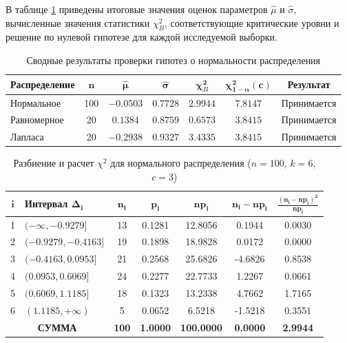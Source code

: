 \documentclass[a4paper, 14pt]{extarticle}
\begin{document}
В таблице \ref{tab:chi2_summary} приведены итоговые значения оценок параметров $\hat{\mu}$ и $\hat{\sigma}$, вычисленные значения статистики $\chi^2_{\textit{B}}$, соответствующие критические уровни и решение по нулевой гипотезе для каждой исследуемой выборки.

\begin{table}[H]
    \centering
    \caption{Сводные результаты проверки гипотез о нормальности распределения}
    \label{tab:chi2_summary}
    \begin{tabular}{|l|c|c|c|c|c|c|}
        \hline
        \textbf{Распределение} & $\mathbf{n}$ & $\mathbf{\hat{\mu}}$ & $\mathbf{\hat{\sigma}}$ & $\mathbf{\chi^2_{\textit{B}}}$ & $\mathbf{\chi^2_{1-\alpha}(c)}$ & \textbf{Результат} \\ \hline
        Нормальное & 100 & $-0.0503$ & $0.7728$ & $2.9944$ & $7.8147$ & Принимается \\ \hline
        Равномерное & 20 & $0.1384$ & $0.8759$ & $0.6573$ & $3.8415$ & Принимается \\ \hline
        Лапласа & 20 & $-0.2938$ & $0.9327$ & $3.4335$ & $3.8415$ & Принимается \\ \hline
    \end{tabular}
\end{table}

\begin{table}[H]
    \centering
    \caption{Разбиение и расчет $\chi^2$ для нормального распределения ($n=100$, $k=6$, $c=3$)}
    \label{tab:breakdown_norm}
    \begin{tabular}{|c|l|c|c|c|c|c|}
        \hline
        $\mathbf{i}$ & \textbf{Интервал} $\mathbf{\Delta_i}$ & $\mathbf{n_i}$ & $\mathbf{p_i}$ & $\mathbf{np_i}$ & $\mathbf{n_i - np_i}$ & $\mathbf{\frac{(n_i - np_i)^2}{np_i}}$ \\ \hline
        1 & $(-\infty, -0.9279]$ & 13 & 0.1281 & 12.8056 & 0.1944  & 0.0030 \\ \hline
        2 & $(-0.9279, -0.4163]$ & 19 & 0.1898 & 18.9828 & 0.0172  & 0.0000 \\ \hline
        3 & $(-0.4163, 0.0953]$  & 21 & 0.2568 & 25.6826 & -4.6826 & 0.8538 \\ \hline
        4 & $(0.0953, 0.6069]$   & 24 & 0.2277 & 22.7733 & 1.2267  & 0.0661 \\ \hline
        5 & $(0.6069, 1.1185]$   & 18 & 0.1323 & 13.2338 & 4.7662  & 1.7165 \\ \hline
        6 & $(1.1185, +\infty)$ & 5  & 0.0652 & 6.5218  & -1.5218 & 0.3551 \\ \hline
        \multicolumn{2}{|c|}{\textbf{СУММА}} & \textbf{100} & \textbf{1.0000} & \textbf{100.0000} & \textbf{0.0000} & \textbf{2.9944} \\ \hline
    \end{tabular}
\end{table}
\end{document}
